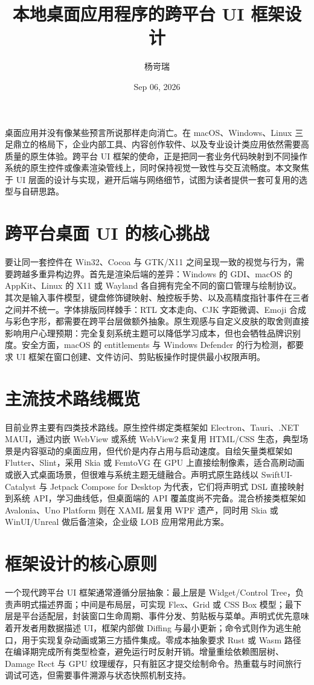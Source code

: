 \title{本地桌面应用程序的跨平台 UI 框架设计}
\author{杨岢瑞}
\date{Sep 06, 2026}
\maketitle
桌面应用并没有像某些预言所说那样走向消亡。在 macOS、Windows、Linux 三足鼎立的格局下，企业内部工具、内容创作软件、以及专业设计类应用依然需要高质量的原生体验。跨平台 UI 框架的使命，正是把同一套业务代码映射到不同操作系统的原生控件或像素渲染管线上，同时保持视觉一致性与交互流畅度。本文聚焦于 UI 层面的设计与实现，避开后端与网络细节，试图为读者提供一套可复用的选型与自研思路。\par
\chapter{跨平台桌面 UI 的核心挑战}
要让同一套控件在 Win32、Cocoa 与 GTK/X11 之间呈现一致的视觉与行为，需要跨越多重异构边界。首先是渲染后端的差异：Windows 的 GDI、macOS 的 AppKit、Linux 的 X11 或 Wayland 各自拥有完全不同的窗口管理与绘制协议。其次是输入事件模型，键盘修饰键映射、触控板手势、以及高精度指针事件在三者之间并不统一。字体排版同样棘手：RTL 文本走向、CJK 字距微调、Emoji 合成与彩色字形，都需要在跨平台层做额外抽象。原生观感与自定义皮肤的取舍则直接影响用户心理预期：完全复刻系统主题可以降低学习成本，但也会牺牲品牌识别度。安全方面，macOS 的 entitlements 与 Windows Defender 的行为检测，都要求 UI 框架在窗口创建、文件访问、剪贴板操作时提供最小权限声明。\par
\chapter{主流技术路线概览}
目前业界主要有四类技术路线。原生控件绑定类框架如 Electron、Tauri、.NET MAUI，通过内嵌 WebView 或系统 WebView2 来复用 HTML/CSS 生态，典型场景是内容驱动的桌面应用，但代价是内存占用与启动速度。自绘矢量类框架如 Flutter、Slint，采用 Skia 或 FemtoVG 在 GPU 上直接绘制像素，适合高刷动画或嵌入式桌面场景，但很难与系统主题无缝融合。声明式原生路线以 SwiftUI-Catalyst 与 Jetpack Compose for Desktop 为代表，它们将声明式 DSL 直接映射到系统 API，学习曲线低，但桌面端的 API 覆盖度尚不完备。混合桥接类框架如 Avalonia、Uno Platform 则在 XAML 层复用 WPF 遗产，同时用 Skia 或 WinUI/Unreal 做后备渲染，企业级 LOB 应用常用此方案。\par
\chapter{框架设计的核心原则}
一个现代跨平台 UI 框架通常遵循分层抽象：最上层是 Widget/Control Tree，负责声明式描述界面；中间是布局层，可实现 Flex、Grid 或 CSS Box 模型；最下层是平台适配层，封装窗口生命周期、事件分发、剪贴板与菜单。声明式优先意味着开发者用数据描述 UI，框架内部做 Diffing 与最小更新；命令式则作为逃生舱口，用于实现复杂动画或第三方插件集成。零成本抽象要求 Rust 或 Wasm 路径在编译期完成所有类型检查，避免运行时反射开销。增量重绘依赖图层树、Damage Rect 与 GPU 纹理缓存，只有脏区才提交绘制命令。热重载与时间旅行调试可选，但需要事件溯源与状态快照机制支持。\par
